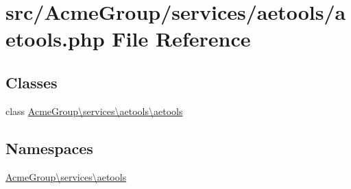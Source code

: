 \hypertarget{aetools_8php}{\section{src/\+Acme\+Group/services/aetools/aetools.php File Reference}
\label{aetools_8php}
}
\subsection*{Classes}
\begin{DoxyCompactItemize}
\item 
class \hyperlink{class_acme_group_1_1services_1_1aetools_1_1aetools}{Acme\+Group\textbackslash{}services\textbackslash{}aetools\textbackslash{}aetools}
\end{DoxyCompactItemize}
\subsection*{Namespaces}
\begin{DoxyCompactItemize}
\item 
 \hyperlink{namespace_acme_group_1_1services_1_1aetools}{Acme\+Group\textbackslash{}services\textbackslash{}aetools}
\end{DoxyCompactItemize}
